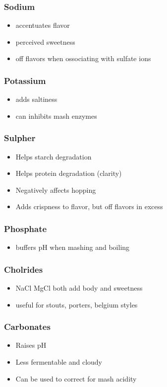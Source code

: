 \documentclass{beamer}
\begin{document}
\begin{frame}\frametitle{Sodium}
  \begin{itemize}
  \item accentuates flavor
    \item perceived sweetness
    \item off flavors when ossociating with sulfate ions
  \end{itemize}
\end{frame}

\begin{frame}\frametitle{Potassium}
  \begin{itemize}
  \item adds saltiness
    \item can inhibits mash enzymes
  \end{itemize}
\end{frame}

\begin{frame}\frametitle{Sulpher}
  \begin{itemize}
  \item Helps starch degradation
  \item Helps protein degradation (clarity)
    \item Negatively affects hopping
    \item Adds crispness to flavor, but off flavors in excess
  \end{itemize}
\end{frame}

\begin{frame}\frametitle{Phosphate}
  \begin{itemize}
  \item buffers pH when mashing and boiling
  \end{itemize}
\end{frame}

\begin{frame}\frametitle{Cholrides}
  \begin{itemize}
  \item NaCl MgCl both add body and sweetness
    \item useful for stouts, porters, belgium styles
  \end{itemize}
\end{frame}

\begin{frame}\frametitle{Carbonates}
  \begin{itemize}
  \item Raises pH
  \item Less fermentable and cloudy
    \item Can be used to correct for mash acidity
  \end{itemize}
\end{frame}
\end{document}
